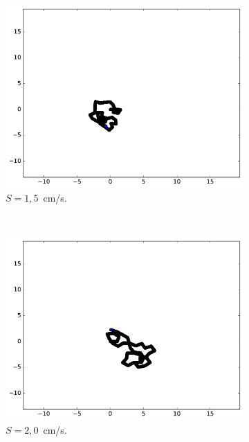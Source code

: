 \begin{figure}[htb]
\begin{subfigure}[t]{\subImgWmo}
			\centering
			\includegraphics[width=\textwidth]{figures/ch3/spTraj_1_5_120_2}
			\caption[$S = 1,5$]{$S = 1,5$~cm/s.}
			\label{fig:spTraj_1_5_120_2}
		\end{subfigure}
		~
		\begin{subfigure}[t]{\subImgWmo}
			\centering
			\includegraphics[width=\textwidth]{figures/ch3/spTraj_2_0_120_2}
			\caption[$S = 2,0$]{$S = 2,0$~cm/s.}
			\label{fig:spTraj_2_0_120_2}
		\end{subfigure}
		~
		\begin{subfigure}[t]{\subImgWmo}
			\centering

\end{subfigure}
\end{figure}
